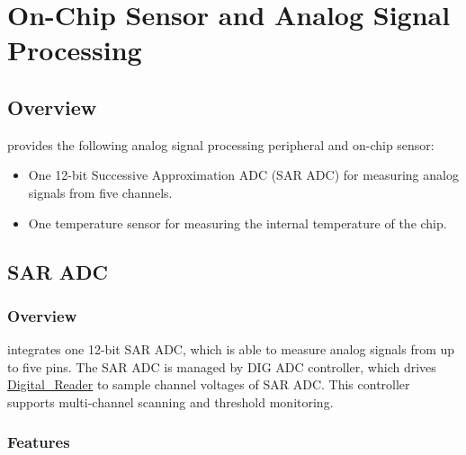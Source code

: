 \documentclass[main\_\_EN.tex]{subfiles}
\begin{document}

\ifglobal
\else
    {\let\clearpage\relax \listoftodos}
    {\let\clearpage\relax \listofdonetodos}
    \tableofcontents
\fi



\hypertarget{sensor}{}
\chapter{On-Chip Sensor and Analog Signal Processing}
\label{mod:sensor}

\section{Overview}

\chipname{} provides the following analog signal processing peripheral and on-chip sensor:

\begin{itemize}
    \item One 12-bit Successive Approximation ADC (SAR ADC) for measuring analog signals from five channels.
    \item One temperature sensor for measuring the internal temperature of the \chipname{} chip.
\end{itemize}

\section{SAR ADC}\label{sec:sensor-sar-adc}

\subsection{Overview}

\chipname{} integrates one 12-bit SAR ADC, which is able to measure analog signals from up to five pins. The SAR ADC is managed by DIG ADC controller, which drives  \hyperref[other:sensor-item-read-data-from-sar-adc1]{Digital\_Reader} to sample channel voltages of SAR ADC. This controller supports multi-channel scanning and threshold monitoring. 

\subsection{Features}
\end{document}
